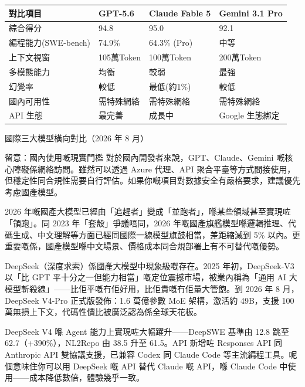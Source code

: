 \begin{center}
\begin{tabularx}{\linewidth}{|X|X|X|X|}
\hline
\textbf{對比項目} & \textbf{GPT-5.6} & \textbf{Claude Fable 5} & \textbf{Gemini 3.1 Pro} \tabularnewline
\hline
綜合得分 & 94.8 & 95.0 & 92.1 \tabularnewline
編程能力(SWE-bench) & 74.9\% & 64.3\% (Pro) & 中等 \tabularnewline
上下文視窗 & 105萬Token & 100萬Token & 200萬Token \tabularnewline
多模態能力 & 均衡 & 較弱 & 最強 \tabularnewline
幻覺率 & 較低 & 最低(約1\%) & 較低 \tabularnewline
國內可用性 & 需特殊網絡 & 需特殊網絡 & 需特殊網絡 \tabularnewline
API 生態 & 最完善 & 成長中 & Google 生態綁定 \tabularnewline
\hline
\end{tabularx}
\end{center}

\begin{center}\small\color{gray}國際三大模型橫向對比（2026 年 8 月）\end{center}

\begin{tcbwarn}{留意：國內使用嘅現實門檻}
對於國內開發者來說，GPT、Claude、Gemini 嘅核心障礙係網絡訪問。雖然可以透過 Azure 代理、API 聚合平臺等方式間接使用，但穩定性同合規性需要自行評估。如果你嘅項目對數據安全有嚴格要求，建議優先考慮國產模型。

\end{tcbwarn}


2026 年嘅國產大模型已經由「追趕者」變成「並跑者」，喺某些領域甚至實現咗「領跑」。同 2023 年「套殼」爭議唔同，2026 年嘅國產旗艦模型喺邏輯推理、代碼生成、中文理解等方面已經同國際一線模型旗鼓相當，差距縮減到 5\% 以內。更重要嘅係，國產模型喺中文場景、價格成本同合規部署上有不可替代嘅優勢。


DeepSeek（深度求索）係國產大模型中現象級嘅存在。2025 年初，DeepSeek-V3 以「比 GPT 平十分之一但能力相當」嘅定位震撼市場，被業內稱為「通用 AI 大模型斬殺線」——比佢平嘅冇佢好用，比佢貴嘅冇佢量大管飽。到 2026 年 8 月，DeepSeek V4-Pro 正式版發佈：1.6 萬億參數 MoE 架構，激活約 49B，支援 100 萬無損上下文，代碼性價比被廣泛認為係全球天花板。

DeepSeek V4 喺 Agent 能力上實現咗大幅躍升——DeepSWE 基準由 12.8 跳至 62.7（+390\%），NL2Repo 由 38.5 升至 61.5。API 新增咗 Responses API 同 Anthropic API 雙協議支援，已兼容 Codex 同 Claude Code 等主流編程工具。呢個意味住你可以用 DeepSeek 嘅 API 替代 Claude 嘅 API，喺 Claude Code 中使用——成本降低數倍，體驗幾乎一致。


